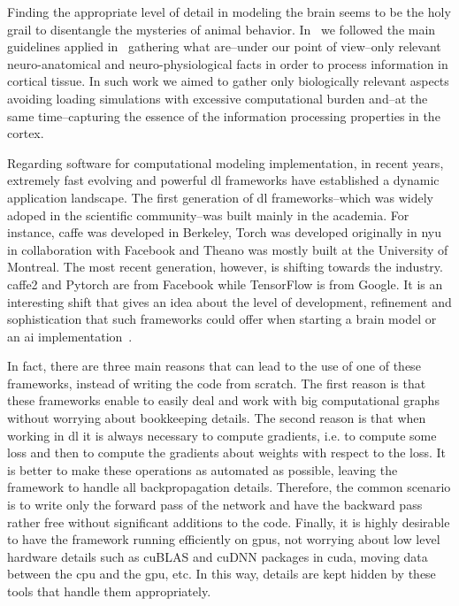 \documentclass[10pt,journal,compsoc]{IEEEtran}
\begin{document}
Finding the appropriate level of detail in modeling the brain seems to be the holy grail to disentangle the mysteries of animal behavior. In~\cite{Dematties2018} we followed the main guidelines applied in~\cite{10.3389/fncir.2016.00023} gathering what are--under our point of view--only relevant neuro-anatomical and neuro-physiological facts in order to process information in cortical tissue. In such work we aimed to gather only biologically relevant aspects avoiding loading simulations with excessive computational burden and--at the same time--capturing the essence of the information processing properties in the cortex.

Regarding software for computational modeling implementation, in recent years, extremely fast evolving and powerful \gls{dl} frameworks have established a dynamic application landscape. The first generation of \gls{dl} frameworks--which was widely adoped in the scientific community--was built mainly in the academia. For instance, \gls{caffe} was developed in Berkeley, Torch was developed originally in \gls{nyu} in collaboration with Facebook and Theano was mostly built at the University of Montreal. The most recent generation, however, is shifting towards the industry. \gls{caffe}2 and Pytorch are from Facebook while TensorFlow is from Google. It is an interesting shift  that gives an idea about the level of development, refinement and sophistication that such frameworks could offer when starting a brain model or an \gls{ai} implementation~\cite{Bahrampour2015ComparativeSO,7979887}. 

In fact, there are three main reasons that can lead to the use of one of these frameworks, instead of writing the code from scratch. The first reason is that these frameworks enable to easily deal and work with big computational graphs without worrying about bookkeeping details. The second reason is that when working in \gls{dl} it is always necessary to compute gradients, i.e. to compute some loss and then to compute the gradients about weights with respect to the loss. It is better to make these operations as automated as possible, leaving the framework to handle all backpropagation details. Therefore, the common scenario is to write only the forward pass of the network and have the backward pass rather free without significant additions to the code. Finally, it is highly desirable to have the framework running efficiently on \glspl{gpu}, not worrying about low level hardware details such as cuBLAS and cuDNN packages in \gls{cuda}, moving data between the \gls{cpu} and the \gls{gpu}, etc. In this way, details are kept hidden by these tools that handle them appropriately.
\end{document}
